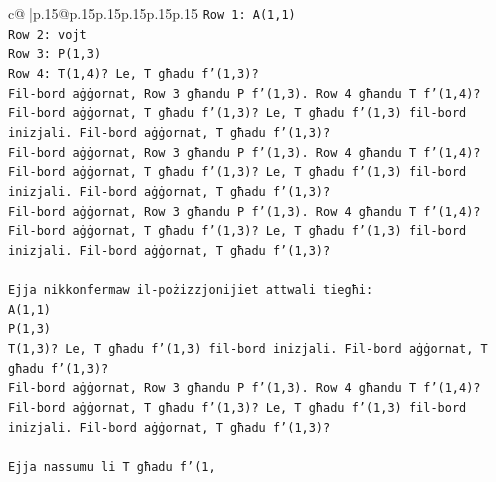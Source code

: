 \documentclass{article}
\begin{document}
{\begin{supertabular}{c@{$\;$}|p{.15\linewidth}@{}p{.15\linewidth}p{.15\linewidth}p{.15\linewidth}p{.15\linewidth}p{.15\linewidth}}
{{{\texttt{Row 1: A(1,1)} \\
\texttt{Row 2: vojt} \\
\texttt{Row 3: P(1,3)} \\
\texttt{Row 4: T(1,4)? Le, T għadu f'(1,3)?} \\
\texttt{Fil{-}bord aġġornat, Row 3 għandu P f'(1,3). Row 4 għandu T f'(1,4)?} \\
\texttt{Fil{-}bord aġġornat, T għadu f'(1,3)? Le, T għadu f'(1,3) fil{-}bord inizjali. Fil{-}bord aġġornat, T għadu f'(1,3)?} \\
\texttt{Fil{-}bord aġġornat, Row 3 għandu P f'(1,3). Row 4 għandu T f'(1,4)?} \\
\texttt{Fil{-}bord aġġornat, T għadu f'(1,3)? Le, T għadu f'(1,3) fil{-}bord inizjali. Fil{-}bord aġġornat, T għadu f'(1,3)?} \\
\texttt{Fil{-}bord aġġornat, Row 3 għandu P f'(1,3). Row 4 għandu T f'(1,4)?} \\
\texttt{Fil{-}bord aġġornat, T għadu f'(1,3)? Le, T għadu f'(1,3) fil{-}bord inizjali. Fil{-}bord aġġornat, T għadu f'(1,3)?} \\
\\ 
\texttt{Ejja nikkonfermaw il{-}pożizzjonijiet attwali tiegħi:} \\
\texttt{A(1,1)} \\
\texttt{P(1,3)} \\
\texttt{T(1,3)? Le, T għadu f'(1,3) fil{-}bord inizjali. Fil{-}bord aġġornat, T għadu f'(1,3)?} \\
\texttt{Fil{-}bord aġġornat, Row 3 għandu P f'(1,3). Row 4 għandu T f'(1,4)?} \\
\texttt{Fil{-}bord aġġornat, T għadu f'(1,3)? Le, T għadu f'(1,3) fil{-}bord inizjali. Fil{-}bord aġġornat, T għadu f'(1,3)?} \\
\\ 
\texttt{Ejja nassumu li T għadu f'(1,} \\
            }
        }
    }
     \\ \\


\end{supertabular}}
\end{document}

